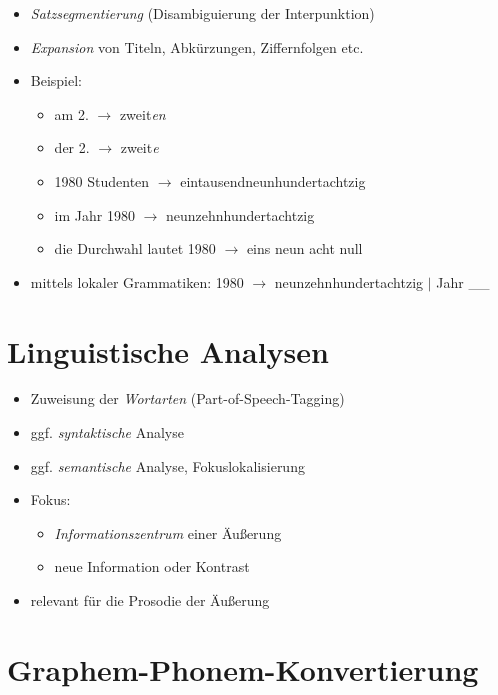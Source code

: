 \documentclass[11pt]{book}
\begin{document}
  \begin{itemize}
  \item \emph{Satzsegmentierung} (Disambiguierung der Interpunktion)
  \item \emph{Expansion} von Titeln, Abkürzungen, Ziffernfolgen etc.
  \item Beispiel: 
  \begin{itemize}
  \item am 2. $\longrightarrow$ zweit\emph{en}
  \item der 2. $\longrightarrow$ zweit\emph{e}
  \item 1980 Studenten $\longrightarrow$ eintausendneunhundertachtzig
  \item im Jahr 1980 $\longrightarrow$ neunzehnhundertachtzig
  \item die Durchwahl lautet 1980 $\longrightarrow$ eins neun acht null
  \end{itemize}
  \item mittels lokaler Grammatiken: 1980 $\longrightarrow$ neunzehnhundertachtzig $|$ Jahr \_\_
  \end{itemize}

  \section{Linguistische Analysen}

  \begin{itemize}
  \item Zuweisung der \emph{Wortarten} (Part-of-Speech-Tagging)
  \item ggf. \emph{syntaktische} Analyse
  \item ggf. \emph{semantische} Analyse, Fokuslokalisierung
  \item Fokus:
  \begin{itemize}
  \item \emph{Informationszentrum} einer Äußerung
  \item neue Information oder Kontrast
  \end{itemize}
  \item relevant für die Prosodie der Äußerung
  \end{itemize}

  \section{Graphem-Phonem-Konvertierung}
\end{document}
